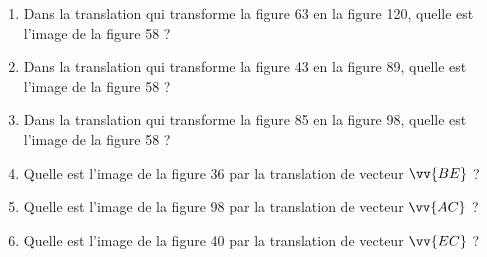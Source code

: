 \documentclass[main.tex]{subfiles}
\begin{document}
\begin{exercise} \hfill 
	\begin{enumerate}[label=\arabic*),leftmargin=*]
		\item  Dans la translation qui transforme la figure 63 en la figure 120, quelle est l'image de la figure 58 ?
		\item  Dans la translation qui transforme la figure 43 en la figure 89, quelle est l'image de la figure 58 ?
		\item  Dans la translation qui transforme la figure 85 en la figure 98, quelle est l'image de la figure 58 ?
		\item Quelle est l'image de la figure 36 par la translation de vecteur $\vv{BE}$ ?
		\item Quelle est l'image de la figure 98 par la translation de vecteur $\vv{AC}$ ?
		\item Quelle est l'image de la figure 40 par la translation de vecteur $\vv{EC}$ ? 
	\end{enumerate}
\end{exercise}
\newpage 
\end{document}
